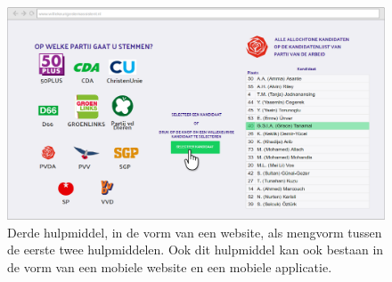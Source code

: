 \begin{figure}[H]


	\includegraphics[width=\linewidth]{website_verkiezingen2.png}

			\caption{Derde hulpmiddel, in de vorm van een website, als mengvorm tussen de eerste twee hulpmiddelen. Ook dit hulpmiddel kan ook bestaan in de vorm van een mobiele website en een mobiele applicatie.}

\label{fig:verkC}
\end{figure}

\newpage 